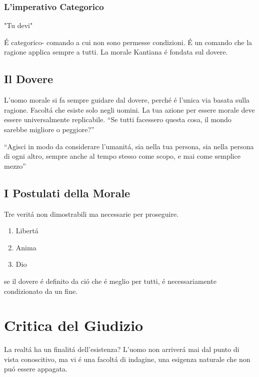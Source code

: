 \documentclass{article}
\begin{document}
\subsubsection{L'imperativo Categorico}
"Tu devi"

É categorico- comando a cui non sono permesse condizioni. É un comando che la ragione applica sempre a tutti. La morale Kantiana é fondata sul dovere.
\subsection{Il Dovere}
L'uomo morale si fa sempre guidare dal dovere, perché é l'unica via basata sulla ragione. Facoltá che esiste solo negli uomini. La tua azione per essere morale deve essere universalmente replicabile. ``Se tutti facessero questa cosa, il mondo sarebbe migliore o peggiore?''

``Agisci in modo da considerare l'umanitá, sia nella tua persona, sia nella persona di ogni altro, sempre anche al tempo stesso come scopo, e mai come semplice mezzo''

\subsection{I Postulati della Morale}
Tre veritá non dimostrabili ma necessarie per proseguire.
\begin{enumerate}
    \item Libertá
    \item Anima
    \item Dio
\end{enumerate}
se il dovere é definito da ció che é meglio per tutti, é necessariamente condizionato da un fine.
\section{Critica del Giudizio}
La realtá ha un finalitá dell'esistenza? L'uomo non arriverá mai dal punto di vista conoscitivo, ma vi é una facoltá di indagine, una esigenza naturale che non puó essere appagata.
\end{document}
